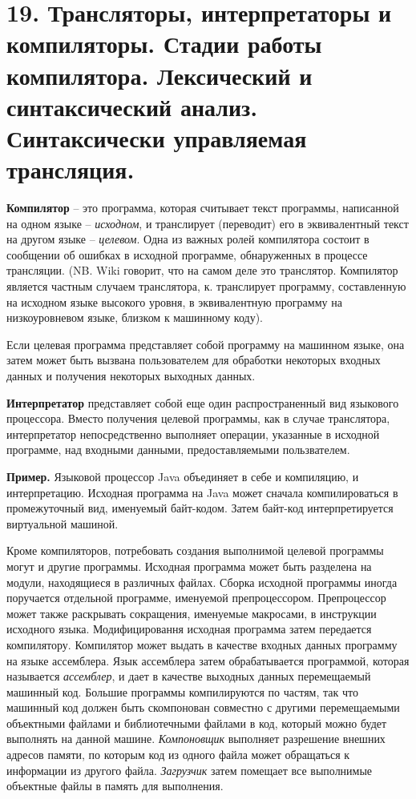 \documentclass[a4paper,12pt]{article}
\begin{document}
\section{19. Трансляторы, интерпретаторы и компиляторы. Стадии работы компилятора. Лексический и синтаксический анализ. Синтаксически управляемая трансляция.}

\textbf{Компилятор} -- это программа, которая считывает текст программы, написанной на одном языке -- \textit{исходном}, и транслирует (переводит) его в эквивалентный текст на другом языке -- \textit{целевом}. Одна из важных ролей компилятора состоит в сообщении об ошибках в исходной программе, обнаруженных в процессе трансляции. (NB. Wiki говорит, что на самом деле это транслятор. Компилятор является частным случаем транслятора, к. транслирует программу, составленную на исходном языке высокого уровня, в эквивалентную программу на низкоуровневом языке, близком к машинному коду).

Если целевая программа представляет собой программу на машинном языке, она затем может быть вызвана пользователем для обработки некоторых входных данных и получения некоторых выходных данных.

\textbf{Интерпретатор} представляет собой еще один распространенный вид языкового процессора. Вместо получения целевой программы, как в случае транслятора, интерпретатор непосредственно выполняет операции, указанные в исходной программе, над входными данными, предоставляемыми пользвателем.

\textbf{Пример.} Языковой процессор Java объединяет в себе и компиляцию, и интерпретацию. Исходная программа на Java может сначала компилироваться в промежуточный вид, именуемый байт-кодом. Затем байт-код интерпретируется виртуальной машиной.

Кроме компиляторов, потребовать создания выполнимой целевой программы могут и другие программы. Исходная программа может быть разделена на модули, находящиеся в различных файлах. Сборка исходной программы иногда поручается отдельной программе, именуемой препроцессором. Препроцессор может также раскрывать сокращения, именуемые макросами, в инструкции исходного языка. Модифицировання исходная программа затем передается компилятору. Компилятор может выдать в качестве входных данных программу на языке ассемблера. Язык ассемблера затем обрабатывается программой, которая называется \textit{ассемблер}, и дает в качестве выходных данных перемещаемый машинный код. Большие программы компилируются по частям, так что машинный код должен быть скомпонован совместно с другими перемещаемыми объектными файлами и библиотечными файлами в код, который можно будет выполнять на данной машине. \textit{Компоновщик} выполняет разрешение внешних адресов памяти, по которым код из одного файла может обращаться к информации из другого файла. \textit{Загрузчик} затем помещает все выполнимые объектные файлы в память для выполнения.
\end{document}
